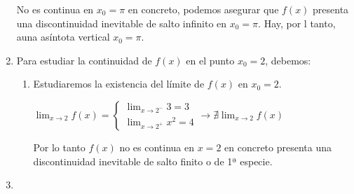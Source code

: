 \begin{enumerate}[label=\color{red}\textbf{\arabic*)}, leftmargin=*]
\qquad\begin{minipage}{0.4\textwidth}
No es continua en $x_0=\pi$ en concreto, podemos asegurar que $f(x)$ presenta una discontinuidad inevitable de salto infinito en $x_0=\pi$. Hay, por l tanto, auna asíntota vertical $x_0=\pi$.
\end{minipage}
\item {}

Para estudiar la continuidad de $f(x)$ en el punto $x_0=2$, debemos: 
\begin{enumerate}[label=\roman*)]
	\item Estudiaremos la existencia del límite de $f(x)$ en $x_0=2$. 
	\begin{center}
		$\lim_{x\to2}f(x)=\begin{cases}
			\lim_{x\to2^-}3=3\\
			\lim_{x\to 2^+}x^2=4
		\end{cases}\longrightarrow\nexists\lim_{x\to 2} f(x)~~$\begin{minipage}{0.4\textwidth}
		Por lo tanto $f(x)$ no es continua en $x=2$ en concreto presenta una discontinuidad inevitable de salto finito o de 1ª especie.
		\end{minipage}
	\end{center}
\end{enumerate}
\item {}


\end{enumerate}
